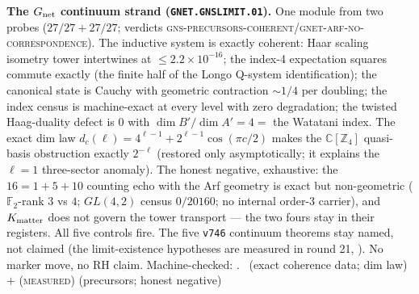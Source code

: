 \documentclass[11pt,a4paper]{article}
\newcommand{\Z}{\mathbb{Z}}
\theoremstyle{definition}
\begin{document}
\par\smallskip\noindent\textbf{The $G_{\rm net}$ continuum strand
(\texttt{GNET.GNSLIMIT.01}).}
One module from two probes ($27/27+27/27$; verdicts
\textsc{gns-precursors-coherent}/\textsc{gnet-arf-no-correspondence}).
The inductive system is exactly coherent: Haar scaling isometry
tower intertwines at $\le2.2\times10^{-16}$; the index-4
expectation squares commute exactly (the finite half of the Longo
Q-system identification); the canonical state is Cauchy with
geometric contraction ${\sim}1/4$ per doubling; the index census
is machine-exact at every level with zero degradation; the
twisted Haag-duality defect is $0$ with $\dim B'/\dim A'=4=$ the
Watatani index.  The exact dim law
$d_c(\ell)=4^{\ell-1}+2^{\ell-1}\cos(\pi c/2)$ makes the
$\mathbb C[\Z_4]$ quasi-basis obstruction exactly $2^{-\ell}$
(restored only asymptotically; it explains the $\ell=1$
three-sector anomaly).  The honest negative, exhaustive: the
$16=1{+}5{+}10$ counting echo with the Arf geometry is exact but
non-geometric ($\mathbb F_2$-rank $3$ vs $4$; $GL(4,2)$ census
$0/20160$; no internal order-3 carrier), and $K_{\rm matter}$ does
not govern the tower transport --- the two fours stay in their
registers.  All five controls fire.  The five \texttt{v746}
continuum theorems stay named, not claimed (the limit-existence
hypotheses are measured in round 21,
).  No marker move, no
RH claim.
Machine-checked: .
\mE\ (exact coherence data; dim law) $+$ (\textsc{measured})
(precursors; honest negative)
\par\smallskip
\end{document}

